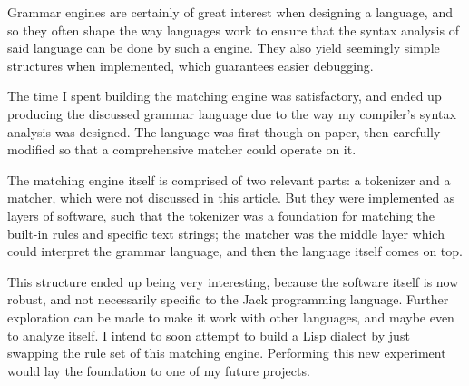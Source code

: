 \documentclass[a4paper,11pt,oneside]{article}
\begin{document}
Grammar engines are certainly of great interest when designing a
language, and so they often shape the way languages work to ensure
that the syntax analysis of said language can be done by such a
engine. They also yield seemingly simple structures when implemented,
which guarantees easier debugging.

The time I spent building the matching engine was satisfactory, and
ended up producing the discussed grammar language due to the way my
compiler's syntax analysis was designed. The language was first though
on paper, then carefully modified so that a comprehensive matcher
could operate on it.

The matching engine itself is comprised of two relevant parts: a
tokenizer and a matcher, which were not discussed in this article. But
they were implemented as layers of software, such that the tokenizer
was a foundation for matching the built-in rules and specific text
strings; the matcher was the middle layer which could interpret the
grammar language, and then the language itself comes on top.

This structure ended up being very interesting, because the software
itself is now robust, and not necessarily specific to the Jack
programming language. Further exploration can be made to make it work
with other languages, and maybe even to analyze itself. I intend to
soon attempt to build a Lisp dialect by just swapping the rule set of
this matching engine. Performing this new experiment would lay the
foundation to one of my future projects.



\label{org61bf86d}



\end{document}

